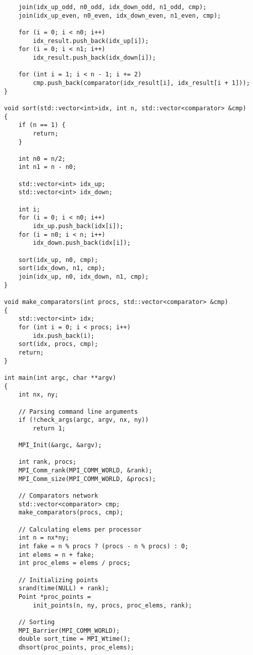 \documentclass[oneside,final,14pt]{extreport}
\begin{document}
\begin{verbatim}
    join(idx_up_odd, n0_odd, idx_down_odd, n1_odd, cmp);
    join(idx_up_even, n0_even, idx_down_even, n1_even, cmp);

    for (i = 0; i < n0; i++)
        idx_result.push_back(idx_up[i]);
    for (i = 0; i < n1; i++)
        idx_result.push_back(idx_down[i]);

    for (int i = 1; i < n - 1; i += 2)
        cmp.push_back(comparator(idx_result[i], idx_result[i + 1]));
}

void sort(std::vector<int>idx, int n, std::vector<comparator> &cmp)
{
    if (n == 1) {
        return;
    }

    int n0 = n/2;
    int n1 = n - n0;

    std::vector<int> idx_up;
    std::vector<int> idx_down;

    int i;
    for (i = 0; i < n0; i++)
        idx_up.push_back(idx[i]);
    for (i = n0; i < n; i++)
        idx_down.push_back(idx[i]);

    sort(idx_up, n0, cmp);
    sort(idx_down, n1, cmp);
    join(idx_up, n0, idx_down, n1, cmp);
}

void make_comparators(int procs, std::vector<comparator> &cmp)
{
    std::vector<int> idx;
    for (int i = 0; i < procs; i++)
        idx.push_back(i);
    sort(idx, procs, cmp);
    return;
}

int main(int argc, char **argv)
{
    int nx, ny;

    // Parsing command line arguments
    if (!check_args(argc, argv, nx, ny))
        return 1;

    MPI_Init(&argc, &argv);

    int rank, procs;
    MPI_Comm_rank(MPI_COMM_WORLD, &rank);
    MPI_Comm_size(MPI_COMM_WORLD, &procs);

    // Comparators network
    std::vector<comparator> cmp;
    make_comparators(procs, cmp);

    // Calculating elems per processor
    int n = nx*ny;
    int fake = n % procs ? (procs - n % procs) : 0;
    int elems = n + fake;
    int proc_elems = elems / procs;

    // Initializing points
    srand(time(NULL) + rank);
    Point *proc_points =
        init_points(n, ny, procs, proc_elems, rank);

    // Sorting
    MPI_Barrier(MPI_COMM_WORLD);
    double sort_time = MPI_Wtime();
    dhsort(proc_points, proc_elems);


\end{verbatim}
\end{document}
